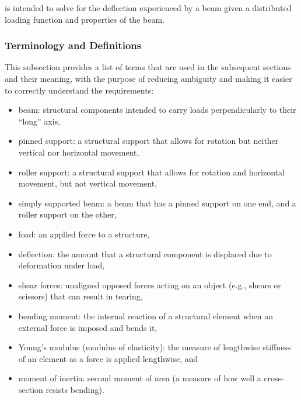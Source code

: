 \documentclass[12pt]{article}
\begin{document}
\progname{} is intended to solve for the deflection experienced by a beam given
a distributed loading function and properties of the beam.

\subsubsection{Terminology and  Definitions}

This subsection provides a list of terms that are used in the subsequent
sections and their meaning, with the purpose of reducing ambiguity and making it
easier to correctly understand the requirements:

\begin{itemize}

    \item beam: structural components intended to carry loads perpendicularly to
          their ``long'' axis\nc{},

    \item pinned support: a structural support that allows for rotation but
          neither vertical nor horizontal movement\nc{},

    \item roller support: a structural support that allows for rotation and
          horizontal movement, but not vertical movement\nc{},

    \item simply supported beam: a beam that has a pinned support on one end,
          and a roller support on the other\nc{},

    \item load: an applied force to a structure\nc{},

    \item deflection: the amount that a structural component is displaced due to
          deformation under load\nc{},

    \item shear forces: unaligned opposed forces acting on an object (e.g.,
          shears or scissors) that can result in tearing\nc{},

    \item bending moment: the internal reaction of a structural element when an
          external force is imposed and bends it\nc{},

    \item Young's modulus (modulus of elasticity): the measure of lengthwise
          stiffness of an element as a force is applied lengthwise\nc{}, and

    \item moment of inertia: second moment of area (a measure of how well a
          cross-section resists bending)\cite{SmithAdviceAndDiscussion2023}.

\end{itemize}
\end{document}
